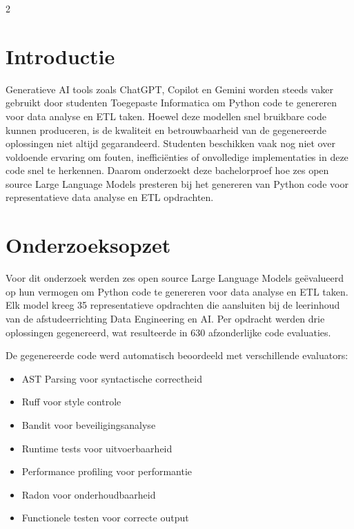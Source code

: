 \documentclass[a0,portrait]{hogent-poster}
\begin{document}
    \begin{multicols}{2}
        
        
        \section{Introductie}
        
        Generatieve AI tools zoals ChatGPT, Copilot en Gemini worden steeds vaker
        gebruikt door studenten Toegepaste Informatica om Python code te genereren
        voor data analyse en ETL taken. Hoewel deze modellen snel bruikbare code
        kunnen produceren, is de kwaliteit en betrouwbaarheid van de gegenereerde
        oplossingen niet altijd gegarandeerd. Studenten beschikken vaak nog niet
        over voldoende ervaring om fouten, inefficiënties of onvolledige
        implementaties in deze code snel te herkennen. Daarom onderzoekt deze
        bachelorproef hoe zes open source Large Language Models presteren bij het
        genereren van Python code voor representatieve data analyse en ETL
        opdrachten.
        
        
        
        
      \section{Onderzoeksopzet}
      
      Voor dit onderzoek werden zes open source Large Language Models geëvalueerd
      op hun vermogen om Python code te genereren voor data analyse en ETL taken.
      Elk model kreeg 35 representatieve opdrachten die aansluiten bij de
      leerinhoud van de afstudeerrichting Data Engineering en AI. Per opdracht
      werden drie oplossingen gegenereerd, wat resulteerde in 630 afzonderlijke
      code evaluaties.
      
      De gegenereerde code werd automatisch beoordeeld met verschillende
      evaluators:
      
      \begin{itemize}
          \item AST Parsing voor syntactische correctheid
          \item Ruff voor style controle
          \item Bandit voor beveiligingsanalyse
          \item Runtime tests voor uitvoerbaarheid
          \item Performance profiling voor performantie
          \item Radon voor onderhoudbaarheid
          \item Functionele testen voor correcte output
      \end{itemize}
        

\end{multicols}
\end{document}
